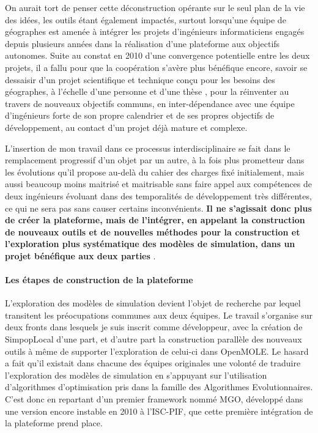 On aurait tort de penser cette déconstruction opérante sur le seul plan de la vie des idées, les outils étant également impactés, surtout lorsqu'une équipe de géographes est amenée à intégrer les projets d'ingénieurs informaticiens engagés depuis plusieurs années dans la réalisation d'une plateforme aux objectifs autonomes. Suite au constat en 2010 d'une convergence potentielle entre les deux projets, il a fallu pour que la coopération s'avère plus bénéfique encore, savoir se dessaisir d'un projet scientifique et technique conçu pour les besoins des géographes, à l'échelle d'une personne et d'une thèse \autocites{Rey2009, Louail2010}⁠, pour la réinventer au travers de nouveaux objectifs communs, en inter-dépendance avec une équipe d'ingénieurs forte de son propre calendrier et de ses propres objectifs de développement, au contact d'un projet déjà mature et complexe. 

L'insertion de mon travail dans ce processus interdisciplinaire se fait dans le remplacement progressif d'un objet par un autre, à la fois plus prometteur dans les évolutions qu'il propose au-delà du cahier des charges fixé initialement, mais aussi beaucoup moins maitrisé et maitrisable sans faire appel aux compétences de deux ingénieurs évoluant dans des temporalités de développement très différentes, ce qui ne sera pas sans causer certains inconvénients. \textbf{Il ne s'agissait donc plus de créer la plateforme, mais de l'intégrer, en appelant la construction de nouveaux outils et de nouvelles méthodes pour la construction et l'exploration plus systématique des modèles de simulation, dans un projet bénéfique aux deux parties} \autocite{Pumain2014}⁠.

\paragraph*{Les étapes de construction de la plateforme}

L'exploration des modèles de simulation devient l'objet de recherche par lequel transitent les préocupations communes aux deux équipes. Le travail s'organise sur deux fronts dans lesquels je suis inscrit comme développeur, avec la création de SimpopLocal d'une part, et d'autre part la construction parallèle des nouveaux outils à même de supporter l'exploration de celui-ci dans OpenMOLE. Le hasard a fait qu'il existait dans chacune des équipes originales une volonté de traduire l'exploration des modèles de simulation en s'appuyant sur l'utilisation d'algorithmes d'optimisation pris dans la famille des Algorithmes Evolutionnaires. C'est donc en repartant d'un premier framework nommé MGO, développé dans une version encore instable en 2010 à l'ISC-PIF, que cette première intégration de la plateforme prend place.

